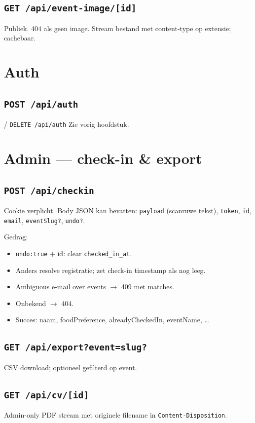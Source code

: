 \documentclass[11pt,a4paper]{report}
\begin{document}
\subsection{\texttt{GET /api/event-image/[id]}}
Publiek. 404 als geen image. Stream bestand met content-type op extensie; cachebaar.

\section{Auth}
\subsection{\texttt{POST /api/auth}} / \texttt{DELETE /api/auth}
Zie vorig hoofdstuk.

\section{Admin --- check-in \& export}

\subsection{\texttt{POST /api/checkin}}
Cookie verplicht. Body JSON kan bevatten:
\texttt{payload} (scanruwe tekst), \texttt{token}, \texttt{id}, \texttt{email},
\texttt{eventSlug?}, \texttt{undo?}.

Gedrag:
\begin{itemize}[leftmargin=*]
  \item \texttt{undo:true} + id: clear \texttt{checked\_in\_at}.
  \item Anders resolve registratie; zet check-in timestamp als nog leeg.
  \item Ambiguous e-mail over events $\to$ 409 met matches.
  \item Onbekend $\to$ 404.
  \item Succes: naam, foodPreference, alreadyCheckedIn, eventName, \ldots
\end{itemize}

\subsection{\texttt{GET /api/export?event=slug?}}
CSV download; optioneel gefilterd op event.

\subsection{\texttt{GET /api/cv/[id]}}
Admin-only PDF stream met originele filename in \texttt{Content-Disposition}.
\end{document}
